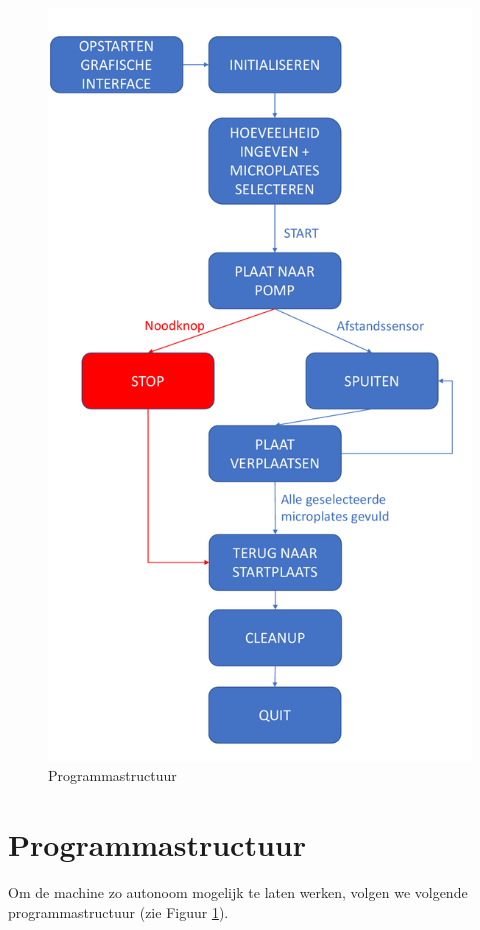 \documentclass[a4paper,twoside,kulak]{kulakreport} %
\begin{document}
\begin{figure}
	\centering
	\includegraphics[width=1\textwidth]{Programmastructuur.pdf}
	\caption{Programmastructuur}
	\label{fig: Programmastrucuur}
	
\end{figure} 

\section{Programmastructuur}
Om de machine zo autonoom mogelijk te laten werken, volgen we volgende programmastructuur (zie Figuur \ref{fig: Programmastrucuur}). 
\end{document}
